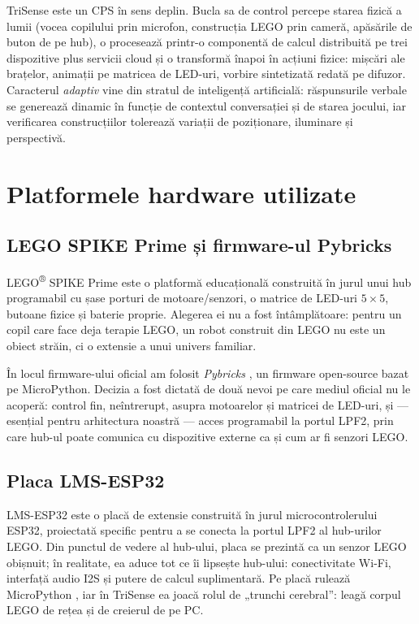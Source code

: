 TriSense este un CPS în sens deplin. Bucla sa de control percepe starea fizică a lumii (vocea copilului prin microfon, construcția LEGO prin cameră, apăsările de buton de pe hub), o procesează printr-o componentă de calcul distribuită pe trei dispozitive plus servicii cloud și o transformă înapoi în acțiuni fizice: mișcări ale brațelor, animații pe matricea de LED-uri, vorbire sintetizată redată pe difuzor. Caracterul \emph{adaptiv} vine din stratul de inteligență artificială: răspunsurile verbale se generează dinamic în funcție de contextul conversației și de starea jocului, iar verificarea construcțiilor tolerează variații de poziționare, iluminare și perspectivă.

\section{Platformele hardware utilizate}

\subsection{LEGO SPIKE Prime și firmware-ul Pybricks}

LEGO\textsuperscript{®} SPIKE\texttrademark{} Prime este o platformă educațională construită în jurul unui hub programabil cu șase porturi de motoare/senzori, o matrice de LED-uri $5\times5$, butoane fizice și baterie proprie. Alegerea ei nu a fost întâmplătoare: pentru un copil care face deja terapie LEGO, un robot construit din LEGO nu este un obiect străin, ci o extensie a unui univers familiar.

În locul firmware-ului oficial am folosit \emph{Pybricks} \cite{pybricks}, un firmware open-source bazat pe MicroPython. Decizia a fost dictată de două nevoi pe care mediul oficial nu le acoperă: control fin, neîntrerupt, asupra motoarelor și matricei de LED-uri, și — esențial pentru arhitectura noastră — acces programabil la portul LPF2, prin care hub-ul poate comunica cu dispozitive externe ca și cum ar fi senzori LEGO.

\subsection{Placa LMS-ESP32}

LMS-ESP32 \cite{antonsmindstorms} este o placă de extensie construită în jurul microcontrolerului ESP32, proiectată specific pentru a se conecta la portul LPF2 al hub-urilor LEGO. Din punctul de vedere al hub-ului, placa se prezintă ca un senzor LEGO obișnuit; în realitate, ea aduce tot ce îi lipsește hub-ului: conectivitate Wi-Fi, interfață audio I2S și putere de calcul suplimentară. Pe placă rulează MicroPython \cite{micropython}, iar în TriSense ea joacă rolul de „trunchi cerebral”: leagă corpul LEGO de rețea și de creierul de pe PC.

